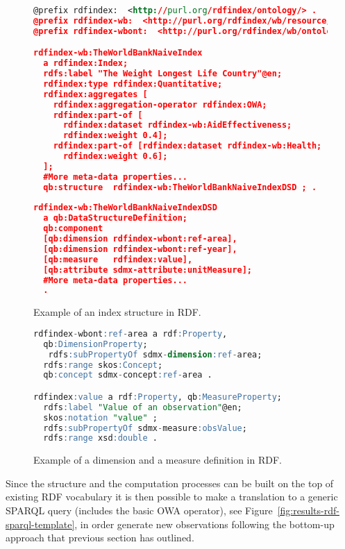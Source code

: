 \begin{figure}[!ht]
\begin{lstlisting}[language=XML]  
@prefix rdfindex:  <http://purl.org/rdfindex/ontology/> .
@prefix rdfindex-wb:  <http://purl.org/rdfindex/wb/resource/> .
@prefix rdfindex-wbont:  <http://purl.org/rdfindex/wb/ontology/> .

rdfindex-wb:TheWorldBankNaiveIndex 
  a rdfindex:Index;
  rdfs:label "The Weight Longest Life Country"@en;
  rdfindex:type rdfindex:Quantitative;
  rdfindex:aggregates [ 		
    rdfindex:aggregation-operator rdfindex:OWA;
    rdfindex:part-of [
      rdfindex:dataset rdfindex-wb:AidEffectiveness; 
      rdfindex:weight 0.4];
    rdfindex:part-of [rdfindex:dataset rdfindex-wb:Health; 
      rdfindex:weight 0.6];
  ];
  #More meta-data properties...
  qb:structure 	rdfindex-wb:TheWorldBankNaiveIndexDSD ; .
  
rdfindex-wb:TheWorldBankNaiveIndexDSD 
  a qb:DataStructureDefinition;  
  qb:component    
  [qb:dimension rdfindex-wbont:ref-area],
  [qb:dimension rdfindex-wbont:ref-year],
  [qb:measure   rdfindex:value],
  [qb:attribute sdmx-attribute:unitMeasure];
  #More meta-data properties...
  .
\end{lstlisting}
\caption{Example of an index structure in RDF.}
 \label{fig:results-rdf-index}
\end{figure}

\begin{figure}[!ht]
\begin{lstlisting}[language=SQL]  
rdfindex-wbont:ref-area a rdf:Property, 
  qb:DimensionProperty; 
   rdfs:subPropertyOf sdmx-dimension:ref-area; 
  rdfs:range skos:Concept; 
  qb:concept sdmx-concept:ref-area . 

rdfindex:value a rdf:Property, qb:MeasureProperty;
  rdfs:label "Value of an observation"@en;
  skos:notation "value" ;
  rdfs:subPropertyOf sdmx-measure:obsValue;
  rdfs:range xsd:double . 
\end{lstlisting}
\caption{Example of a dimension and a measure definition in RDF.}
 \label{fig:results-rdf-properties}
\end{figure}


Since the structure and the computation processes can be built on the top of existing RDF vocabulary it is then 
possible to make a translation to a generic SPARQL query (includes the basic OWA operator), see Figure~\ref{fig:results-rdf-sparql-template}, 
in order generate new observations following the bottom-up approach that previous section has outlined.

